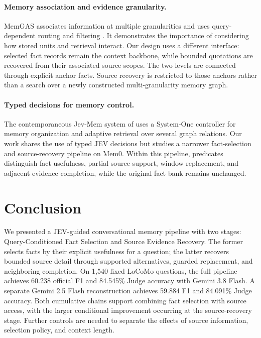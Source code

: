\documentclass[11pt]{article}
\begin{document}
\paragraph{Memory association and evidence granularity.}
MemGAS associates information at multiple granularities and uses query-dependent routing and filtering \citep{xu2025memgas}. It demonstrates the importance of considering how stored units and retrieval interact. Our design uses a different interface: selected fact records remain the context backbone, while bounded quotations are recovered from their associated source scopes. The two levels are connected through explicit anchor facts. Source recovery is restricted to those anchors rather than a search over a newly constructed multi-granularity memory graph.

\paragraph{Typed decisions for memory control.}
The contemporaneous Jev-Mem system of \citet{jiang2026jevmem} uses a System-One controller for memory organization and adaptive retrieval over several graph relations. Our work shares the use of typed JEV decisions but studies a narrower fact-selection and source-recovery pipeline on Mem0. Within this pipeline, predicates distinguish fact usefulness, partial source support, window replacement, and adjacent evidence completion, while the original fact bank remains unchanged.

\section{Conclusion}
We presented a JEV-guided conversational memory pipeline with two stages: Query-Conditioned Fact Selection and Source Evidence Recovery. The former selects facts by their explicit usefulness for a question; the latter recovers bounded source detail through supported alternatives, guarded replacement, and neighboring completion. On 1,540 fixed LoCoMo questions, the full pipeline achieves 60.238 official F1 and 84.545\% Judge accuracy with Gemini 3.8 Flash. A separate Gemini 2.5 Flash reconstruction achieves 59.884 F1 and 84.091\% Judge accuracy. Both cumulative chains support combining fact selection with source access, with the larger conditional improvement occurring at the source-recovery stage. Further controls are needed to separate the effects of source information, selection policy, and context length.
\end{document}
